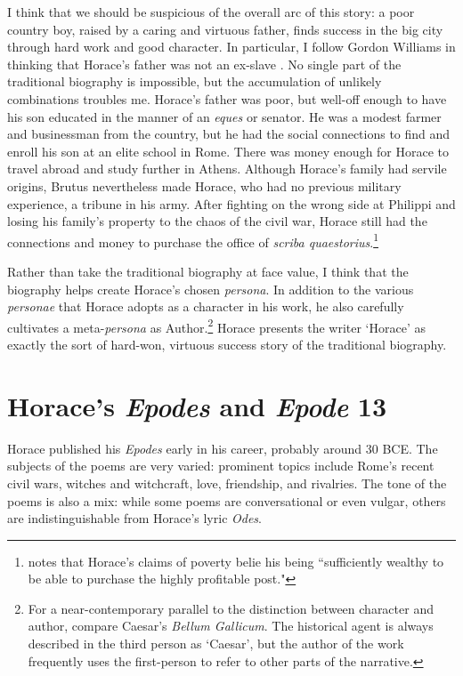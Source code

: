 I think that we should be suspicious of the overall arc of this story: a poor country boy, raised by a caring and virtuous father, finds success in the big city through hard work and good character.  In particular, I follow Gordon Williams in thinking that Horace's father was not an ex-slave \citep{williams1995}.  No single part of the traditional biography is impossible, but the accumulation of unlikely combinations troubles me.  Horace's father was poor, but well-off enough to have his son educated in the manner of an \textit{eques} or senator.  He was a modest farmer and businessman from the country, but he had the social connections to find and enroll his son at an elite school in Rome.  There was money enough for Horace to travel abroad and study further in Athens.  Although Horace's family had servile origins, Brutus nevertheless made Horace, who had no previous military experience, a tribune in his army.  After fighting on the wrong side at Philippi and losing his family's property to the chaos of the civil war, Horace still had the connections and money to purchase the office of \textit{scriba quaestorius}.\footnote{\citet[104]{williams1995} notes that Horace's claims of poverty belie his being ``sufficiently wealthy to be able to purchase the highly profitable post."}

Rather than take the traditional biography at face value, I think that the biography helps create Horace's chosen \textit{persona}.  In addition to the various \textit{personae} that Horace adopts as a character in his work, he also carefully cultivates a meta-\textit{persona} as Author.\footnote{For a near-contemporary parallel to the distinction between character and author, compare Caesar's \textit{Bellum Gallicum}.  The historical agent is always described in the third person as `Caesar', but the author of the work frequently uses the first-person to refer to other parts of the narrative.}  Horace presents the writer `Horace' as exactly the sort of hard-won, virtuous success story of the traditional biography.


\section*{Horace's \textit{Epodes} and \textit{Epode} 13}

Horace published his \textit{Epodes} early in his career, probably around 30 BCE.  The subjects of the poems are very varied: prominent topics include Rome's recent civil wars, witches and witchcraft, love, friendship, and rivalries.  The tone of the poems is also a mix: while some poems are conversational or even vulgar, others are indistinguishable from Horace's lyric \textit{Odes}.

